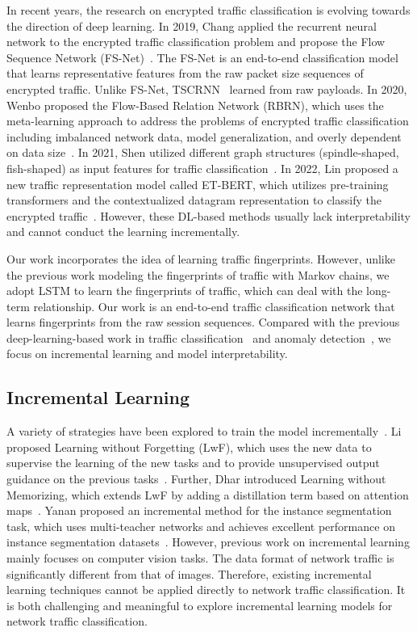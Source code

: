 In recent years, the research on encrypted traffic classification is evolving towards the direction of deep learning. 
In 2019, Chang \etal applied the recurrent neural network to the encrypted traffic classification problem and propose the Flow Sequence Network (FS-Net)~\cite{liu2019fs}. The FS-Net is an end-to-end classification model that learns representative features from the raw packet size sequences of encrypted traffic.
Unlike FS-Net, TSCRNN~\cite{lin2021tscrnn} learned from raw payloads.
In 2020, Wenbo \etal proposed the Flow-Based Relation Network (RBRN), which uses the meta-learning approach to address the problems of encrypted traffic classification including imbalanced network data, model generalization, and overly dependent on data size~\cite{zheng2020learning}.
In 2021, Shen \etal utilized different graph structures (\eg spindle-shaped, fish-shaped) as input features for traffic classification~\cite{shen2021accurate}.
In 2022, Lin \etal proposed a new traffic representation model called ET-BERT, which utilizes pre-training transformers and the contextualized datagram representation to classify the encrypted traffic~\cite{lin2022bert}.
However,  these DL-based methods usually lack interpretability and cannot conduct the learning incrementally.

Our work incorporates the idea of learning traffic fingerprints. 
However, unlike the previous work modeling the fingerprints of traffic with Markov chains, we adopt LSTM to learn the fingerprints of traffic, which can deal with the long-term relationship. 
Our work is an end-to-end traffic classification network that learns fingerprints from the raw session sequences. 
Compared with the previous deep-learning-based work in traffic classification~\cite{fu2021realtime} and anomaly detection~\cite{du2017deeplog}, we focus on incremental learning and model interpretability. 

\subsection{Incremental Learning}
A variety of strategies have been explored to train the model incrementally~\cite{li2017learning, dhar2019learning, gu2021class}. 
Li \etal proposed Learning without Forgetting (LwF), which uses the new data to supervise the learning of the new tasks and to provide unsupervised output guidance on the previous tasks~\cite{li2017learning}. 
Further, Dhar \etal introduced Learning without Memorizing, which extends LwF by adding a distillation term based on attention maps~\cite{dhar2019learning}. 
Yanan \etal proposed an incremental method for the instance segmentation task, which uses multi-teacher networks and achieves excellent performance on instance segmentation datasets~\cite{gu2021class}. 
However, previous work on incremental learning mainly focuses on computer vision tasks. The data format of network traffic is significantly different from that of images. Therefore, existing incremental learning techniques cannot be applied directly to network traffic classification. 
It is both challenging and meaningful to explore incremental learning models for network traffic classification.


